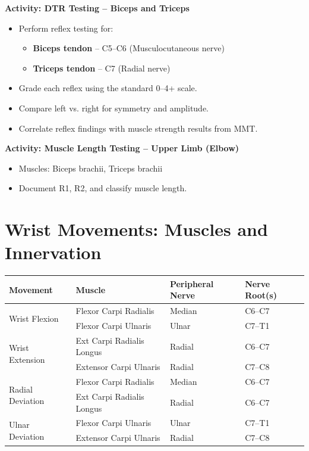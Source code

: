 \begin{labactivitybox}
\textbf{Activity: DTR Testing – Biceps and Triceps}

\begin{itemize}
  \item Perform reflex testing for:
  \begin{itemize}
    \item \textbf{Biceps tendon} – C5–C6 (Musculocutaneous nerve)
    \item \textbf{Triceps tendon} – C7 (Radial nerve)
  \end{itemize}
  \item Grade each reflex using the standard 0–4+ scale.
  \item Compare left vs. right for symmetry and amplitude.
  \item Correlate reflex findings with muscle strength results from MMT.
\end{itemize}
\end{labactivitybox}

\begin{labactivitybox}
\textbf{Activity: Muscle Length Testing – Upper Limb (Elbow)}
\begin{itemize}
  \item Muscles: Biceps brachii, Triceps brachii
  \item Document R1, R2, and classify muscle length.
\end{itemize}
\end{labactivitybox}


\section*{Wrist Movements: Muscles and Innervation}

\vspace{0.5cm}

\begin{tabular}{|p{4cm}|p{4.5cm}|p{4cm}|p{2.5cm}|}
\hline
\textbf{Movement} & \textbf{Muscle} & \textbf{Peripheral Nerve} & \textbf{Nerve Root(s)} \\
\hline
\multirow{2}{*}{Wrist Flexion}
  & Flexor Carpi Radialis & Median & C6–C7 \\
  & Flexor Carpi Ulnaris & Ulnar & C7–T1 \\
\hline
\multirow{2}{*}{Wrist Extension}
  & Ext Carpi Radialis Longus & Radial & C6–C7 \\
  & Extensor Carpi Ulnaris & Radial & C7–C8 \\
\hline
\multirow{2}{*}{Radial Deviation}
  & Flexor Carpi Radialis & Median & C6–C7 \\
  & Ext Carpi Radialis Longus & Radial & C6–C7 \\
\hline
\multirow{2}{*}{Ulnar Deviation}
  & Flexor Carpi Ulnaris & Ulnar & C7–T1 \\
  & Extensor Carpi Ulnaris & Radial & C7–C8 \\
\hline
\end{tabular}

